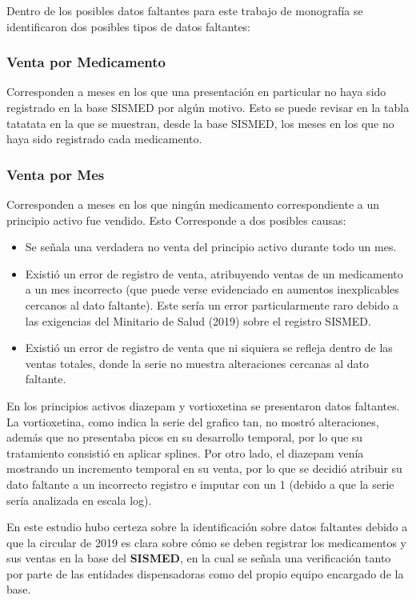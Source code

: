 \documentclass[10pt,twoside,xcolor=table,x11anmes]{IEEEtran}
\begin{document}
Dentro de los posibles datos faltantes para este trabajo de monografía se identificaron dos posibles tipos de datos faltantes:

\subsubsection{Venta por Medicamento}

Corresponden a meses en los que una presentación en particular no haya sido registrado en la base SISMED por algún motivo. Esto se puede revisar en la tabla tatatata en la que se muestran, desde la base SISMED, los meses en los que no haya sido registrado cada medicamento.

\subsubsection{Venta por Mes}

Corresponden a meses en los que ningún medicamento correspondiente a un principio activo fue vendido. Esto Corresponde a dos posibles causas:

\begin{itemize}
    \item Se señala una verdadera no venta del principio activo durante todo un mes.
    \item Existió un error de registro de venta, atribuyendo ventas de un medicamento a un mes incorrecto (que puede verse evidenciado en aumentos inexplicables cercanos al dato faltante). Este sería un error particularmente raro debido a las exigencias del Minitario de Salud (2019) sobre el registro SISMED.
    \item Existió un error de registro de venta que ni siquiera se refleja dentro de las ventas totales, donde la serie no muestra alteraciones cercanas al dato faltante.
\end{itemize}

En los principios activos diazepam y vortioxetina se presentaron datos faltantes. La vortioxetina, como indica la serie del grafico tan, no mostró alteraciones, además que no presentaba picos en su desarrollo temporal, por lo que su tratamiento consistió en aplicar splines. Por otro lado, el diazepam venía mostrando un incremento temporal en su venta, por lo que se decidió atribuir su dato faltante a un incorrecto registro e imputar con un 1 (debido a que la serie sería analizada en escala log).

En este estudio hubo certeza sobre la identificación sobre datos faltantes debido a que la circular de 2019 es clara sobre cómo se deben registrar los medicamentos y sus ventas en la base del \textbf{SISMED}, en la cual se señala una  verificación tanto por parte de las entidades dispensadoras como del propio equipo encargado de la base.
\end{document}
